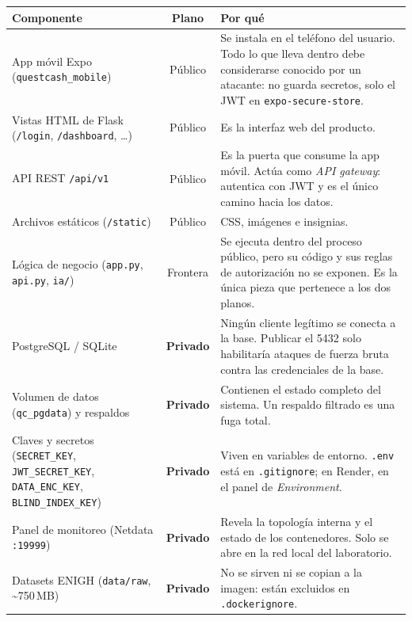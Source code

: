 \documentclass[11pt,letterpaper]{article}
\begin{document}
\begin{center}
\small
\begin{tabular}{@{}>{\raggedright\arraybackslash}p{4.3cm} c >{\raggedright\arraybackslash}p{7.4cm}@{}}
\toprule
\textbf{Componente} & \textbf{Plano} & \textbf{Por qué} \\
\midrule
App móvil Expo (\texttt{questcash\_mobile})
  & Público
  & Se instala en el teléfono del usuario. Todo lo que lleva dentro debe
    considerarse conocido por un atacante: no guarda secretos, solo el JWT en
    \texttt{expo-secure-store}. \\[3pt]
Vistas HTML de Flask (\texttt{/login}, \texttt{/dashboard}, …)
  & Público
  & Es la interfaz web del producto. \\[3pt]
API REST \texttt{/api/v1}
  & Público
  & Es la puerta que consume la app móvil. Actúa como \emph{API gateway}:
    autentica con JWT y es el único camino hacia los datos. \\[3pt]
Archivos estáticos (\texttt{/static})
  & Público
  & CSS, imágenes e insignias. \\[3pt]
\midrule
Lógica de negocio (\texttt{app.py}, \texttt{api.py}, \texttt{ia/})
  & Frontera
  & Se ejecuta dentro del proceso público, pero su código y sus reglas de
    autorización no se exponen. Es la única pieza que pertenece a los dos
    planos. \\[3pt]
\midrule
PostgreSQL / SQLite
  & \textbf{Privado}
  & Ningún cliente legítimo se conecta a la base. Publicar el 5432 solo
    habilitaría ataques de fuerza bruta contra las credenciales de la base. \\[3pt]
Volumen de datos (\texttt{qc\_pgdata}) y respaldos
  & \textbf{Privado}
  & Contienen el estado completo del sistema. Un respaldo filtrado es una
    fuga total. \\[3pt]
Claves y secretos (\texttt{SECRET\_KEY}, \texttt{JWT\_SECRET\_KEY}, \texttt{DATA\_ENC\_KEY}, \texttt{BLIND\_INDEX\_KEY})
  & \textbf{Privado}
  & Viven en variables de entorno. \texttt{.env} está en \texttt{.gitignore};
    en Render, en el panel de \emph{Environment}. \\[3pt]
Panel de monitoreo (Netdata \texttt{:19999})
  & \textbf{Privado}
  & Revela la topología interna y el estado de los contenedores. Solo se abre
    en la red local del laboratorio. \\[3pt]
Datasets ENIGH (\texttt{data/raw}, \textasciitilde 750\,MB)
  & \textbf{Privado}
  & No se sirven ni se copian a la imagen: están excluidos en
    \texttt{.dockerignore}. \\
\bottomrule
\end{tabular}
\end{center}
\end{document}

